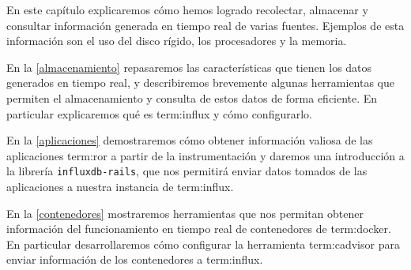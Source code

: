 En este capítulo explicaremos cómo hemos logrado recolectar, almacenar y
consultar información generada en tiempo real de varias fuentes. Ejemplos de
esta información son el uso del disco rígido, los procesadores y la memoria.

En la \autoref{almacenamiento} repasaremos las características que tienen los
datos generados en tiempo real, y describiremos brevemente algunas herramientas
que permiten el almacenamiento y consulta de estos datos de forma eficiente. En
particular explicaremos qué es \gls{term:influx} y cómo configurarlo.

En la \autoref{aplicaciones} demostraremos cómo obtener información valiosa de
las aplicaciones \gls{term:ror} a partir de la instrumentación y daremos una
introducción a la librería \texttt{influxdb-rails}, que nos permitirá enviar
datos tomados de las aplicaciones a nuestra instancia de \gls{term:influx}.

En la \autoref{contenedores} mostraremos herramientas que nos permitan obtener
información del funcionamiento en tiempo real de contenedores de
\gls{term:docker}. En particular desarrollaremos cómo configurar la herramienta
\gls{term:cadvisor} para enviar información de los contenedores a
\gls{term:influx}.
